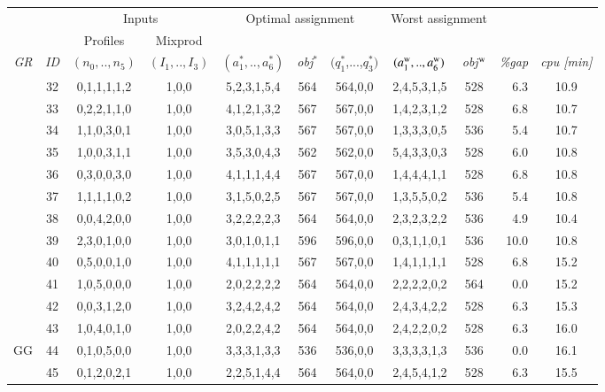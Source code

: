 \documentclass[review,12pt, 3p, times]{elsarticle}
\begin{document}
\begin{longtable}{|c|c|c|c|c|c|c|c|c|r|c|}
	\hline
	& & \multicolumn{2}{c|}{Inputs} & \multicolumn{3}{c|}{Optimal assignment} & \multicolumn{2}{c|}{Worst assignment }& \multicolumn{2}{c|}{}\\
	&  & Profiles & Mixprod & \multicolumn{3}{c|}{} & \multicolumn{2}{c|}{} & \multicolumn{2}{c|}{}\\
    \it{GR} & \it{ID} & \multicolumn{1}{c|}{$(n_0,..,n_5)$} & \multicolumn{1}{c|}{$(I_1,..,I_3)$} & {$(a^*_1,..,a^*_6)$} & \it{obj}$^*$ & $(q^*_1$,...,$q^*_3)$ & {$(a^{\textsc{w}}_1,..,a^{\textsc{w}}_6)$} & \it{obj}$^{\textsc{w}}$ & \it{\%gap}   & \it{ cpu [min]} \\
	\hline
    & 32 & 0,1,1,1,1,2 & 1,0,0 &5,2,3,1,5,4 & 564 & 564,0,0 & 2,4,5,3,1,5 & 528 & 6.3 & 10.9 \\
    & 33 & 0,2,2,1,1,0 & 1,0,0 &4,1,2,1,3,2 & 567 & 567,0,0 & 1,4,2,3,1,2 & 528 & 6.8  & 10.7 \\
    & 34 & 1,1,0,3,0,1 & 1,0,0 &3,0,5,1,3,3 & 567 & 567,0,0 & 1,3,3,3,0,5 & 536 & 5.4  & 10.7 \\
    & 35 & 1,0,0,3,1,1 & 1,0,0 & 3,5,3,0,4,3 & 562 & 562,0,0 & 5,4,3,3,0,3 & 528 & 6.0   & 10.8 \\ 
    & 36 & 0,3,0,0,3,0 & 1,0,0 &4,1,1,1,4,4 & 567 & 567,0,0 & 1,4,4,4,1,1 & 528 & 6.8  & 10.8 \\
    & 37 & 1,1,1,1,0,2 & 1,0,0 &3,1,5,0,2,5 & 567 & 567,0,0 & 1,3,5,5,0,2 & 536 & 5.4  & 10.8 \\
    & 38 & 0,0,4,2,0,0 & 1,0,0 &3,2,2,2,2,3 & 564 & 564,0,0 & 2,3,2,3,2,2 & 536 & 4.9  & 10.4 \\
    & 39 & 2,3,0,1,0,0 & 1,0,0 &3,0,1,0,1,1 & 596 & 596,0,0 & 0,3,1,1,0,1 & 536 & 10.0 & 10.8 \\
    & 40 & 0,5,0,0,1,0 & 1,0,0 &4,1,1,1,1,1 & 567 & 567,0,0 & 1,4,1,1,1,1 & 528 & 6.8  & 15.2 \\
    & 41 & 1,0,5,0,0,0 & 1,0,0 &2,0,2,2,2,2 & 564 & 564,0,0 & 2,2,2,2,0,2 & 564 & 0.0  & 15.2 \\
    & 42 & 0,0,3,1,2,0 & 1,0,0 &3,2,4,2,4,2 & 564 & 564,0,0 & 2,4,3,4,2,2 & 528 & 6.3  & 15.3 \\
    & 43 & 1,0,4,0,1,0 & 1,0,0 &2,0,2,2,4,2 & 564 & 564,0,0 & 2,4,2,2,0,2 & 528 & 6.3  & 16.0 \\
    {GG}\label{SEN:GG} & 44 & 0,1,0,5,0,0 & 1,0,0 &3,3,3,1,3,3 & 536 & 536,0,0 & 3,3,3,3,1,3 & 536 & 0.0  & 16.1 \\
    & 45 & 0,1,2,0,2,1 & 1,0,0 &2,2,5,1,4,4 & 564 & 564,0,0 & 2,4,5,4,1,2 & 528 & 6.3  & 15.5 \\

\end{longtable}
\end{document}
